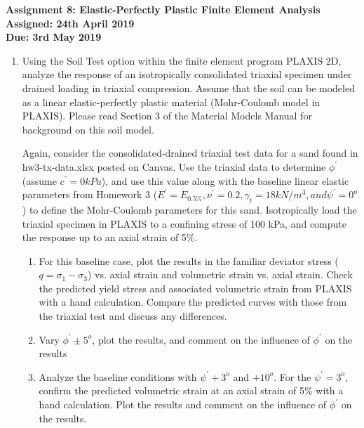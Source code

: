 \documentclass[a4paper,12pt]{article}
\begin{document}
\begin{centering}
	\textbf{
		Assignment 8: Elastic-Perfectly Plastic Finite Element Analysis\\
		Assigned: 24th April 2019\\
		Due: 3rd May 2019\\
	}
\end{centering}

\vspace{1em}
 
\begin{enumerate}

	\item  Using the Soil Test option within the finite element program PLAXIS 2D, analyze the
	response of an isotropically consolidated triaxial specimen under drained loading in triaxial
	compression. Assume that the soil can be modeled as a linear elastic-perfectly plastic
	material (Mohr-Coulomb model in PLAXIS). Please read Section 3 of the Material Models
	Manual for background on this soil model.
	
	Again, consider the consolidated-drained triaxial test data for a sand found in hw3-tx-data.xlsx posted on Canvas. Use the triaxial data to determine $\phi^\prime$ (assume $c^\prime = 0 kPa$), and use this value along with the baseline linear elastic parameters from Homework 3 ($E^\prime = E_{0.5\%}, \nu^\prime = 0.2, \gamma_t = 18 kN/m^3, and \psi^\prime = 0^o$) to define the Mohr-Coulomb parameters for this sand.
	Isotropically load the triaxial specimen in PLAXIS to a confining stress of 100 kPa, and
	compute the response up to an axial strain of 5\%.
	
	\begin{enumerate}
		\item For this baseline case, plot the results in the familiar deviator stress ($q = \sigma_1 - \sigma_3$) vs. axial
		strain and volumetric strain vs. axial strain. Check the predicted yield stress and
		associated volumetric strain from PLAXIS with a hand calculation. Compare the
		predicted curves with those from the triaxial test and discuss any differences.
		
		\item Vary $\phi^\prime \pm 5^o$, plot the results, and comment on the influence of $\phi^\prime$ on the results

		\item Analyze the baseline conditions with $\psi^\prime + 3^o$ and $+10^o$. For the  $\psi^\prime = 3^o$, confirm the
		predicted volumetric strain at an axial strain of 5\% with a hand calculation. Plot the
		results and comment on the influence of $\phi^\prime$ on the results.
		

\end{enumerate}
\end{enumerate}
\end{document}
